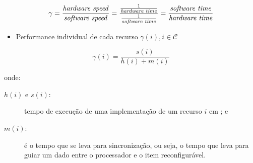    \begin{frame}{\Speedup}

      \begin{equation}
         \gamma =
         \frac{
            \text{\textit{hardware speed}}
         }{
            \text{\textit{software speed}}
         }
         =
         \frac{
            \frac{
               1
            } {
               \text{\textit{hardware time}}
            }
         } {
            \frac{
               1
            }{
               \text{\textit{software time}}
            }
         }
         =
         \frac{
            \text{\textit{software time}}
         } {
            \text{\textit{hardware time}}
         }
      \end{equation}

      \begin{itemize}
         \item Performance individual de cada recurso $ \gamma(i), i \in \mathcal{C} $
      \end{itemize}
   
     \begin{equation}
        \gamma(i) = \frac{s(i)}{h(i) + m(i)}
     \end{equation}
      
      onde:

  
      \begin{description}
          \item [$ h(i) $ e $ s(i) $:] tempo de execução de uma implementação de um recurso $ i $ em \hs; e 
          
          \item [$ m(i) $:] é o tempo que se leva para sincronização, ou seja, o tempo que leva para guiar um dado entre o processador e o item reconfigurável.
      \end{description}
   \end{frame}

